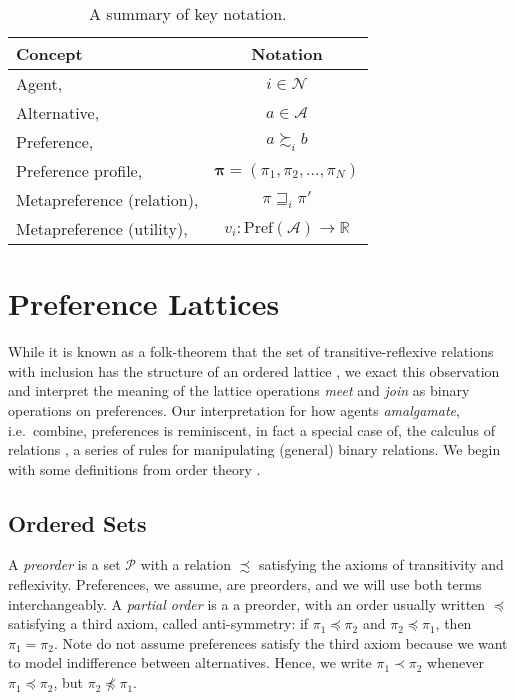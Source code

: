 \documentclass[conference]{ieeeconf}
\newcommand{\R}{\mathbb{R}}
\newcommand{\N}{\mathcal{N}}
\newcommand{\A}{\mathcal{A}}
\renewcommand{\P}{\mathcal{P}}
\newcommand{\Pref}{\mathrm{Pref}}
\newcommand{\prefers}{\succsim}
\newcommand{\metaprefers}{\sqsupseteq}
\begin{document}
\begin{table}
\centering
\caption{A summary of key notation.}
\label{table:notation}
\begin{tabular}{p{5cm}c}
\toprule
Concept & Notation \\
\midrule
Agent, & $i \in \N$ \\
Alternative, & $a \in \A$ \\
Preference, & $a \prefers_i b$ \\
Preference profile, & $\boldsymbol{\pi} = \left(\pi_1,\pi_2,\dots,\pi_N\right)$ \\
Metapreference (relation), & $\pi \metaprefers_i \pi'$ \\
Metapreference (utility), & $v_i: \Pref(\A) \to \R$\\
\bottomrule
\end{tabular}
\end{table}

\section{Preference Lattices}
\label{sec:algebraic}

While it is known as a folk-theorem that the set of transitive-reflexive relations with inclusion has the structure of an ordered lattice \cite{birkhoff1940}, we exact this observation and interpret the meaning of the lattice operations \emph{meet} and \emph{join} as binary operations on preferences. Our interpretation for how agents \emph{amalgamate}, i.e.~combine, preferences is reminiscent, in fact a special case of, the calculus of relations \cite{tarski1941}, a series of rules for manipulating (general) binary relations. We begin with some definitions from order theory \cite{roman}.

\subsection{Ordered Sets}

A \emph{preorder} is a set $\P$ with a relation $\precsim$ satisfying the axioms of transitivity and reflexivity. Preferences, we assume, are preorders, and we will use both terms interchangeably. A \emph{partial order} is a a preorder, with an order usually written $\preceq$ satisfying a third axiom, called anti-symmetry: if $\pi_1 \preceq \pi_2$ and $\pi_2 \preceq \pi_1$, then $\pi_1 = \pi_2$. Note do not assume preferences satisfy the third axiom because we want to model indifference between alternatives. Hence, we write $\pi_1 \prec \pi_2$ whenever $\pi_1 \preceq \pi_2$, but $\pi_2 \not \preceq \pi_1$.
 
\end{document}
